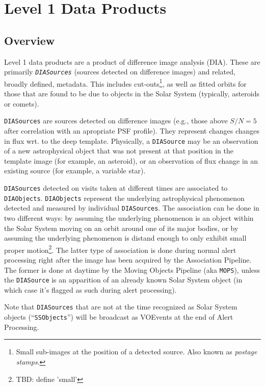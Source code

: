 \documentclass[12pt]{article}
\newcommand{\code}[1]{\texttt{#1}}
\newcommand{\DIASource}{\code{DIASource}\xspace}
\newcommand{\DIASources}{\code{DIASources}\xspace}
\newcommand{\DIAObjects}{\code{DIAObjects}\xspace}
\newcommand{\SSObjects}{\code{SSObjects}\xspace}
\begin{document}

\section{Level 1 Data Products}

\subsection{Overview}

Level 1 data products are a product of difference image analysis (DIA). These are primarily {\em \DIASources} (sources detected on difference images) and related, broadly defined, metadata. This includes cut-outs\footnote{Small sub-images at the position of a detected source. Also known as {\em postage stamps}.}, as well as fitted orbits for those that are found to be due to objects in the Solar System (typically, asteroids or comets).

\DIASources are sources detected on difference images (e.g., those above $S/N=5$ after correlation with an apropriate PSF profile). They represent changes changes in flux wrt. to the deep template. Physically, a \DIASource may be an observation of a new astrophysical object that was not present at that position in the template image (for example, an asteroid), or an observation of flux change in an existing source (for example, a variable star).

\DIASources detected on visits taken at different times are associated to \DIAObjects. \DIAObjects represent the underlying astrophysical phenomenon detected and measured by individual \DIASources. The association can be done in two different ways: by assuming the underlying phenomenon is an object within the Solar System moving on an orbit around one of its major bodies, or by assuming the underlying phenomenon is distand enough to only exhibit small proper motion\footnote{TBD: define 'small'}. The latter type of association is done during normal alert processing right after the image has been acquired by the Association Pipeline. The former is done at daytime by the Moving Objects Pipeline (aka \code{MOPS}), unless the \DIASource is an apparition of an already known Solar System object (in which case it's flagged as such during alert processing).

Note that \DIASources that are not at the time recognized as Solar System objects (``\SSObjects'') will be broadcast as VOEvents at the end of Alert Processing.
\end{document}
